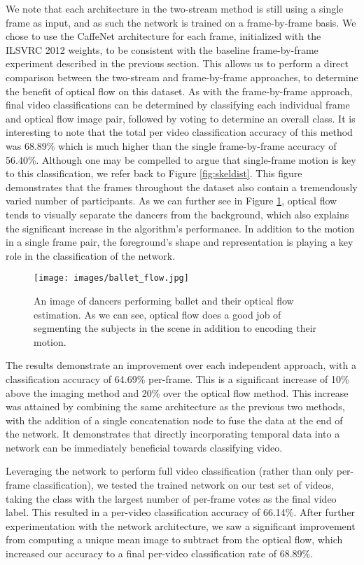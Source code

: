 \documentclass[10pt,twocolumn,letterpaper]{article}
\begin{document}
We note that each architecture in the two-stream method is still using a single frame as input, and as such the network is trained on a frame-by-frame basis. We chose to use the CaffeNet architecture for each frame, initialized with the ILSVRC 2012 weights, to be consistent with the baseline frame-by-frame experiment described in the previous section. This allows us to perform a direct comparison between the two-stream and frame-by-frame approaches, to determine the benefit of optical flow on this dataset. As with the frame-by-frame approach, final video classifications can be determined by classifying each individual frame and optical flow image pair, followed by voting to determine an overall class. It is interesting to note that the total per video classification accuracy of this method was 68.89\% which is much higher than the single frame-by-frame accuracy of 56.40\%. Although one may be compelled to argue that single-frame motion is key to this classification, we refer back to Figure \ref{fig:skeldist}. This figure demonstrates that the frames throughout the dataset also contain a tremendously varied number of participants. As we can further see in Figure \ref{fig:optical_flow}, optical flow tends to visually separate the dancers from the background, which also explains the significant increase in the algorithm's performance. In addition to the motion in a single frame pair, the foreground's shape and representation is playing a key role in the classification of the network.

\begin{figure}[t]
\centering
\texttt{[image: images/ballet\_flow.jpg]}
\caption{An image of dancers performing ballet and their optical flow estimation. As we can see, optical flow does a good job of segmenting the subjects in the scene in addition to encoding their motion.}
\label{fig:optical_flow}
\end{figure}

 The results demonstrate an improvement over each independent approach, with a classification accuracy of 64.69\% per-frame. This is a significant increase of 10\% above the imaging method and 20\% over the optical flow method. This increase was attained by combining the same architecture as the previous two methods, with the addition of a single concatenation node to fuse the data at the end of the network. It demonstrates that directly incorporating temporal data into a network can be immediately beneficial towards classifying video.

Leveraging the network to perform full video classification (rather than only per-frame classification), we tested the trained network on our test set of videos, taking the class with the largest number of per-frame votes as the final video label. This resulted in a per-video classification accuracy of 66.14\%. After further experimentation with the network architecture, we saw a significant improvement from computing a unique mean image to subtract from the optical flow, which increased our accuracy to a final per-video classification rate of 68.89\%.
\end{document}

